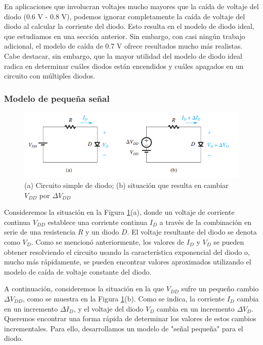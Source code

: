 En aplicaciones que involucran voltajes mucho mayores que la caída de voltaje del diodo (0.6 V - 0.8 V), podemos ignorar completamente la caída de voltaje del diodo al calcular la corriente del diodo. Esto resulta en el modelo de diodo ideal, que estudiamos en una sección anterior. Sin embargo, con casi ningún trabajo adicional, el modelo de caída de 0.7 V ofrece resultados mucho más realistas. Cabe destacar, sin embargo, que la mayor utilidad del modelo de diodo ideal radica en determinar cuáles diodos están encendidos y cuáles apagados en un circuito con múltiples diodos.

\subsubsection{Modelo de pequeña señal}

\begin{figure}
    \centering
    \includegraphics[scale=0.6]{Electronica/diodo_f8.png}
    \caption{(a) Circuito simple de diodo; (b) situación que resulta en cambiar $V_{DD}$ por $\Delta V_{DD}$}
    \label{fig_CircuitoSimpleParaPequenasenal}
\end{figure}

Consideremos la situación en la Figura \ref{fig_CircuitoSimpleParaPequenasenal}(a), donde un voltaje de corriente continua \( V_{DD} \) establece una corriente continua \( I_D \) a través de la combinación en serie de una resistencia \( R \) y un diodo \( D \). El voltaje resultante del diodo se denota como \( V_D \). Como se mencionó anteriormente, los valores de \( I_D \) y \( V_D \) se pueden obtener resolviendo el circuito usando la característica exponencial del diodo o, mucho más rápidamente, se pueden encontrar valores aproximados utilizando el modelo de caída de voltaje constante del diodo.

A continuación, consideremos la situación en la que \( V_{DD} \) sufre un pequeño cambio \( \Delta V_{DD} \), como se muestra en la Figura \ref{fig_CircuitoSimpleParaPequenasenal}(b). Como se indica, la corriente \( I_D \) cambia en un incremento \( \Delta I_D \), y el voltaje del diodo \( V_D \) cambia en un incremento \( \Delta V_D \). Queremos encontrar una forma rápida de determinar los valores de estos cambios incrementales. Para ello, desarrollamos un modelo de "señal pequeña" para el diodo.

